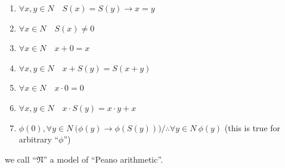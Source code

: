 \documentclass[10pt,a4paper]{book}
\begin{document}
\begin{enumerate}
    \setlength{\itemsep}{0pt} %
    \item       $\forall x , y  \in N \quad S(x ) = S( y ) \to x = y   $
    \item       $\forall x  \in N \quad S(x ) \not=  0$
    \item       $\forall x  \in N \quad x +  0 = x $
    \item       $\forall x , y  \in N \quad x +S( y ) = S(x  +  y )  $
    \item       $\forall x  \in N \quad x  \cdot  0 =  0$
    \item       $\forall x , y  \in N \quad x  \cdot S( y ) = x  \cdot  y +  x    $
    \item        $\phi( 0) , \forall  y  \in N \ \Big( \phi( y ) \to \phi(S( y )) \Big) / \therefore \forall  y \in N \ \phi( y )$
          (this is true for arbitrary ``$\phi$'')
\end{enumerate}
we call ``$\mathfrak{N}$'' a model of ``Peano arithmetic''.
\end{document}
